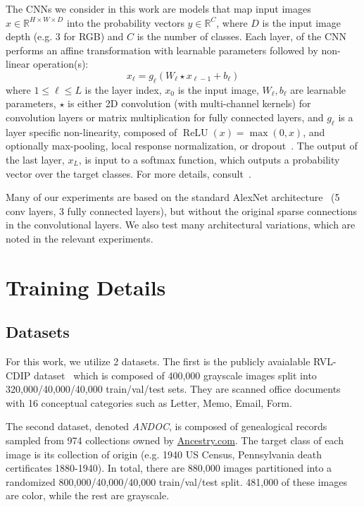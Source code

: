 \documentclass[10pt, conference, compsocconf]{IEEEtran}
\begin{document}
The CNNs we consider in this work are models that map input images $x \in \mathbb{R}^{H \times W \times D}$ into the probability vectors $y \in \mathbb{R}^C$, where $D$ is the input image depth (e.g. 3 for RGB) and $C$ is the number of classes.
Each layer, of the CNN performs an affine transformation with learnable parameters followed by non-linear operation(s):
\begin{equation} \label{eq:cnn}
x_{\ell} = g_{\ell}(W_{\ell} \star x_{\ell - 1} + b_{\ell})
\end{equation}
where $1 \leq \ell \leq L$ is the layer index, $x_0$ is the input image, $W_{\ell}, b_{\ell}$ are learnable parameters, $\star$ is either 2D convolution (with multi-channel kernels) for convolution layers or matrix multiplication for fully connected layers, and $g_{\ell}$ is a layer specific non-linearity, composed of $\operatorname{ReLU}(x) = \operatorname{max}(0, x)$, and optionally max-pooling, local response normalization, or dropout~\cite{krizhevsky12}.
The output of the last layer, $x_L$, is input to a softmax function, which outputs a probability vector over the target classes.
For more details, consult~\cite{krizhevsky12}.

Many of our experiments are based on the standard AlexNet architecture~\cite{krizhevsky12} (5 conv layers, 3 fully connected layers), but without the original sparse connections in the convolutional layers.
We also test many architectural variations, which are noted in the relevant experiments.

\section{Training Details}

\subsection{Datasets}

For this work, we utilize 2 datasets.
The first is the publicly avaialable RVL-CDIP dataset~\cite{harley15} which is composed of 400,000 grayscale images split into 320,000/40,000/40,000 train/val/test sets.
They are scanned office documents with 16 conceptual categories such as Letter, Memo, Email, Form.

The second dataset, denoted \emph{ANDOC}, is composed of genealogical records sampled from 974 collections owned by \url{Ancestry.com}. 
The target class of each image is its collection of origin (e.g. 1940 US Census, Pennsylvania death certificates 1880-1940).
In total, there are 880,000 images partitioned into a randomized 800,000/40,000/40,000 train/val/test split.
481,000 of these images are color, while the rest are grayscale.
\end{document}
